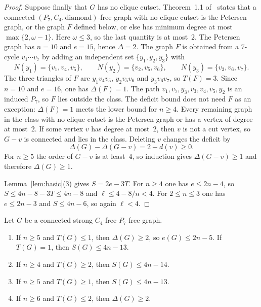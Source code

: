 \documentclass[ASNA]{USG}
\theoremstyle{WBstyletwo}
\numberwithin{equation}{section}
\newcommand{\lr}{\ell}
\begin{document}
\begin{proof}
Suppose finally that $G$ has no clique cutset. Theorem~1.1 of~\cite{cwx} states that a connected $(P_7,C_4,\mathrm{diamond})$-free graph with no clique cutset is the Petersen graph, or the graph $F$ defined below, or else has minimum degree at most $\max\{2,\omega-1\}$. Here $\omega\le 3$, so the last quantity is at most~$2$. The Petersen graph has $n=10$ and $e=15$, hence $\Delta=2$. The graph $F$ is obtained from a $7$-cycle $v_1\cdots v_7$ by adding an independent set $\{y_1,y_2,y_3\}$ with
\[
N(y_1)=\{v_1,v_4,v_5\},\qquad
N(y_2)=\{v_2,v_5,v_6\},\qquad
N(y_3)=\{v_3,v_6,v_7\}.
\]
The three triangles of $F$ are $y_1v_4v_5$, $y_2v_5v_6$ and $y_3v_6v_7$, so $T(F)=3$. Since $n=10$ and $e=16$, one has $\Delta(F)=1$. The path $v_1,v_7,y_3,v_3,v_4,v_5,y_2$ is an induced $P_7$, so $F$ lies outside the class. The deficit bound does not need $F$ as an exception: $\Delta(F)=1$ meets the lower bound for $n\ge 4$. Every remaining graph in the class with no clique cutset is the Petersen graph or has a vertex of degree at most~$2$. If some vertex $v$ has degree at most~$2$, then $v$ is not a cut vertex, so $G-v$ is connected and lies in the class. Deleting $v$ changes the deficit by
\[
\Delta(G)-\Delta(G-v)=2-d(v)\ge 0.
\]
For $n\ge 5$ the order of $G-v$ is at least~$4$, so induction gives $\Delta(G-v)\ge 1$ and therefore $\Delta(G)\ge 1$.

Lemma~\ref{lem:basic}(3) gives $S=2e-3T$. For $n\ge 4$ one has $e\le 2n-4$, so $S\le 4n-8-3T\le 4n-8$ and $\lr\le 4-8/n<4$. For $2\le n\le 3$ one has $e\le 2n-3$ and $S\le 4n-6$, so again $\lr<4$.
\end{proof}

\begin{lemma}\label{lem:delta2}
Let $G$ be a connected strong $C_4$-free $P_7$-free graph.
\begin{enumerate}
\item If $n\ge 5$ and $T(G)\le 1$, then $\Delta(G)\ge 2$, so $e(G)\le 2n-5$. If $T(G)=1$, then $S(G)\le 4n-13$.
\item If $n\ge 4$ and $T(G)\ge 2$, then $S(G)\le 4n-14$.
\item If $n\ge 5$ and $T(G)\ge 1$, then $S(G)\le 4n-13$.
\item If $n\ge 6$ and $T(G)\le 2$, then $\Delta(G)\ge 2$.
\end{enumerate}
\end{lemma}
\end{document}
